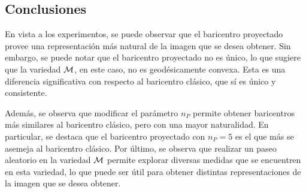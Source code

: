 \subsection{Conclusiones}\label{ssec:sgdwp-conclusiones}  %

En vista a los experimentos, se puede observar que el baricentro proyectado provee una representación más natural de la imagen que se desea obtener.
Sin embargo, se puede notar que el baricentro proyectado no es único, lo que sugiere que la variedad $\operatorname{\mathcal{M}}$, en este caso, no es geodésicamente convexa. Esta es una diferencia significativa con respecto al baricentro clásico, que sí es único y consistente.

Además, se observa que modificar el parámetro $n_P$ permite obtener baricentros más similares al baricentro clásico, pero con una mayor naturalidad. En particular, se destaca que el baricentro proyectado con $n_P=5$ es el que más se asemeja al baricentro clásico.
Por último, se observa que realizar un paseo aleatorio en la variedad $\operatorname{\mathcal{M}}$ permite explorar diversas medidas que se encuentren en esta variedad, lo que puede ser útil para obtener distintas representaciones de la imagen que se desea obtener.

